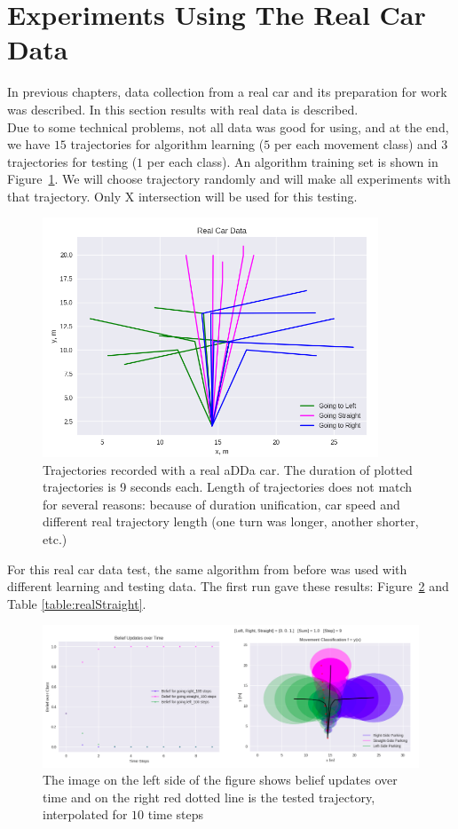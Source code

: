 \section{Experiments Using The Real Car Data}

In previous chapters, data collection from a real car and its preparation for work was described. In this section results with real data is described. \\
Due to some technical problems, not all data was good for using, and at the end, we have $15$ trajectories for algorithm learning ($5$ per each movement class) and $3$ trajectories for testing ($1$ per each class). An algorithm training set is shown in Figure~\ref{fig:RealSet}. We will choose trajectory randomly and will make all experiments with that trajectory. Only X intersection will be used for this testing.

\begin{figure}[H]
	\centering  	
	\includegraphics[width=10cm]{img/RealDataSet.png}
	\caption{Trajectories recorded with a real aDDa car. The duration of plotted trajectories is 9 seconds each. Length of trajectories does not match for several reasons: because of  duration unification, car speed and different real trajectory length (one turn was longer, another shorter, etc.)}
	\label{fig:RealSet}    
\end{figure}

For this real car data test, the same algorithm from before was used with different learning and testing data. The first run gave these results: Figure~\ref{fig:RealStraight} and Table \ref{table:realStraight}.

\begin{figure}[H]
	\centering  	
	\includegraphics[width=13cm]{img/RealStraight.png}
	\caption{The image on the left side of the figure shows belief updates over time and on the right red dotted line is the tested trajectory, interpolated for $10$ time steps}
	\label{fig:RealStraight}    
\end{figure}

